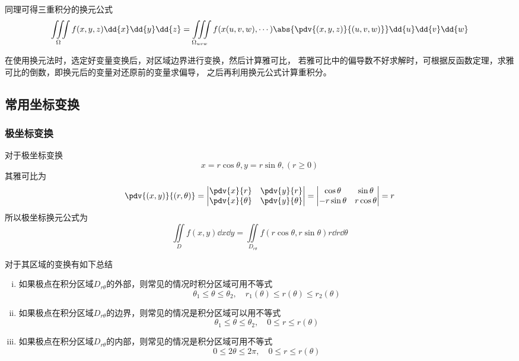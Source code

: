 同理可得三重积分的换元公式
\begin{equation}
    \iiint\limits_\Omega f(x,y,z)\dd{x}\dd{y}\dd{z} = \iiint\limits_{\Omega_{uvw}} f(x(u,v,w),\cdots)\abs{\pdv{(x,y,z)}{(u,v,w)}}\dd{u}\dd{v}\dd{w}
\end{equation}

在使用换元法时，选定好变量变换后，对区域边界进行变换，然后计算雅可比，
若雅可比中的偏导数不好求解时，可根据反函数定理，求雅可比的倒数，即换元后的变量对还原前的变量求偏导，
之后再利用换元公式计算重积分。

\subsection{常用坐标变换}
\subsubsection{极坐标变换}
对于极坐标变换
\[ x = r\cos\theta, y = r\sin\theta, (r \geq 0) \]
其雅可比为
\[
    \pdv{(x,y)}{(r,\theta)} =
    \begin{vmatrix}
        \pdv{x}{r}      & \pdv{y}{r}      \\
        \pdv{x}{\theta} & \pdv{y}{\theta}
    \end{vmatrix}
    =
    \begin{vmatrix}
        \cos\theta   & \sin\theta  \\
        -r\sin\theta & r\cos\theta
    \end{vmatrix}
    =
    r
\]
所以极坐标换元公式为
\begin{equation}
    \iint\limits_D f(x,y)\dd{x}\dd{y} = \iint\limits_{D_{r\theta}} f(r\cos\theta, r\sin\theta) r\dd{r}\dd{\theta}
\end{equation}

对于其区域的变换有如下总结
\begin{enumerate}[(i)]
    \item 如果极点在积分区域$D_{r\theta}$的外部，则常见的情况时积分区域可用不等式
          \[ \theta_1 \leq \theta \leq \theta_2, \quad r_1(\theta) \leq r(\theta) \leq r_2(\theta) \]
    \item 如果极点在积分区域$D_{r\theta}$的边界，则常见的情况是积分区域可以用不等式
          \[ \theta_1 \leq \theta \leq \theta_2,\quad 0 \leq r \leq r(\theta) \]
    \item 如果极点在积分区域$D_{r\theta}$的内部，则常见的情况是积分区域可用不等式
          \[ 0\leq 2\theta \leq 2\pi,\quad 0\leq r\leq r(\theta) \]
\end{enumerate}

